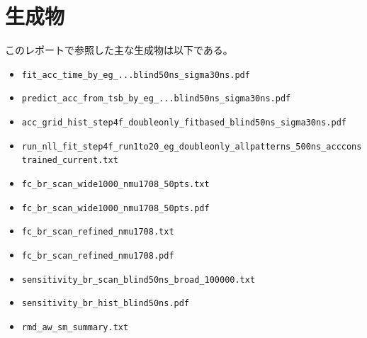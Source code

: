 \documentclass[a4paper,11pt]{jsarticle}
\begin{document}
\section{生成物}
このレポートで参照した主な生成物は以下である。
\begin{itemize}
  \item \texttt{fit\_acc\_time\_by\_eg\_...blind50ns\_sigma30ns.pdf}
  \item \texttt{predict\_acc\_from\_tsb\_by\_eg\_...blind50ns\_sigma30ns.pdf}
  \item \texttt{acc\_grid\_hist\_step4f\_doubleonly\_fitbased\_blind50ns\_sigma30ns.pdf}
  \item \texttt{run\_nll\_fit\_step4f\_run1to20\_eg\_doubleonly\_allpatterns\_500ns\_accconstrained\_current.txt}
  \item \texttt{fc\_br\_scan\_wide1000\_nmu1708\_50pts.txt}
  \item \texttt{fc\_br\_scan\_wide1000\_nmu1708\_50pts.pdf}
  \item \texttt{fc\_br\_scan\_refined\_nmu1708.txt}
  \item \texttt{fc\_br\_scan\_refined\_nmu1708.pdf}
  \item \texttt{sensitivity\_br\_scan\_blind50ns\_broad\_100000.txt}
  \item \texttt{sensitivity\_br\_hist\_blind50ns.pdf}
  \item \texttt{rmd\_aw\_sm\_summary.txt}
\end{itemize}
\end{document}
